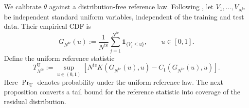 \documentclass[review,11pt,3p,authoryear,nopreprintline]{elsarticle}
\begin{document}
We calibrate $\theta$ against a distribution-free reference law. Following \citet{L.J23}, let $V_1,\ldots,V_{N^{\mathrm{te}}}$ be independent standard uniform variables, independent of the training and test data. Their empirical CDF is
\begin{equation}
  G_{N^{\mathrm{te}}}(u):=\frac{1}{N^{\mathrm{te}}}\sum_{j=1}^{N^{\mathrm{te}}}\mathbf 1_{\{V_j\le u\}},\qquad u\in[0,1].
  \label{eq-dw-reference-cdf}
\end{equation}
Define the uniform reference statistic
\begin{equation}
  T_{N^{\mathrm{te}}}^{\mathrm U}:=\sup_{u\in(0,1)}\left[N^{\mathrm{te}}K\!\left(G_{N^{\mathrm{te}}}(u),u\right)-C_1\!\left(G_{N^{\mathrm{te}}}(u),u\right)\right].
  \label{eq-dw-reference-statistic}
\end{equation}
Here $\Pr_{\mathrm U}$ denotes probability under the uniform reference law. The next proposition converts a tail bound for the reference statistic into coverage of the residual distribution.
\end{document}

